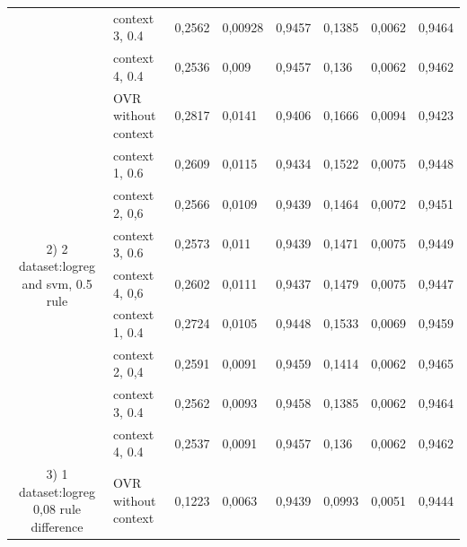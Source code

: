 \documentclass{siamart171218}
\begin{document}
\begin{appendices}
\begin{table}[H]
{\begin{tabular}{|c|l|lll|lll|}
 & context 3, 0.4 & \multicolumn{1}{l|}{0,2562} & \multicolumn{1}{l|}{0,00928} & 0,9457 & \multicolumn{1}{l|}{0,1385} & \multicolumn{1}{l|}{0,0062} & 0,9464 \\ \cline{2-8} 
 & context 4, 0.4 & \multicolumn{1}{l|}{0,2536} & \multicolumn{1}{l|}{0,009} & 0,9457 & \multicolumn{1}{l|}{0,136} & \multicolumn{1}{l|}{0,0062} & 0,9462 \\ \hline
\multirow{9}{*}{2) 2 dataset:logreg and svm, 0.5 rule} & OVR   without context & \multicolumn{1}{l|}{0,2817} & \multicolumn{1}{l|}{0,0141} & 0,9406 & \multicolumn{1}{l|}{0,1666} & \multicolumn{1}{l|}{0,0094} & 0,9423 \\ \cline{2-8} 
 & context 1, 0.6 & \multicolumn{1}{l|}{0,2609} & \multicolumn{1}{l|}{0,0115} & 0,9434 & \multicolumn{1}{l|}{0,1522} & \multicolumn{1}{l|}{0,0075} & 0,9448 \\ \cline{2-8} 
 & context 2, 0,6 & \multicolumn{1}{l|}{0,2566} & \multicolumn{1}{l|}{0,0109} & 0,9439 & \multicolumn{1}{l|}{0,1464} & \multicolumn{1}{l|}{0,0072} & 0,9451 \\ \cline{2-8} 
 & context 3, 0.6 & \multicolumn{1}{l|}{0,2573} & \multicolumn{1}{l|}{0,011} & 0,9439 & \multicolumn{1}{l|}{0,1471} & \multicolumn{1}{l|}{0,0075} & 0,9449 \\ \cline{2-8} 
 & context 4, 0,6 & \multicolumn{1}{l|}{0,2602} & \multicolumn{1}{l|}{0,0111} & 0,9437 & \multicolumn{1}{l|}{0,1479} & \multicolumn{1}{l|}{0,0075} & 0,9447 \\ \cline{2-8} 
 & context 1, 0.4 & \multicolumn{1}{l|}{0,2724} & \multicolumn{1}{l|}{0,0105} & 0,9448 & \multicolumn{1}{l|}{0,1533} & \multicolumn{1}{l|}{0,0069} & 0,9459 \\ \cline{2-8} 
 & context 2, 0,4 & \multicolumn{1}{l|}{0,2591} & \multicolumn{1}{l|}{0,0091} & 0,9459 & \multicolumn{1}{l|}{0,1414} & \multicolumn{1}{l|}{0,0062} & 0,9465 \\ \cline{2-8} 
 & context 3, 0.4 & \multicolumn{1}{l|}{0,2562} & \multicolumn{1}{l|}{0,0093} & 0,9458 & \multicolumn{1}{l|}{0,1385} & \multicolumn{1}{l|}{0,0062} & 0,9464 \\ \cline{2-8} 
 & context 4, 0.4 & \multicolumn{1}{l|}{0,2537} & \multicolumn{1}{l|}{0,0091} & 0,9457 & \multicolumn{1}{l|}{0,136} & \multicolumn{1}{l|}{0,0062} & 0,9462 \\ \hline
\multirow{9}{*}{3) 1 dataset:logreg 0,08 rule difference} & OVR   without context & \multicolumn{1}{l|}{0,1223} & \multicolumn{1}{l|}{0,0063} & 0,9439 & \multicolumn{1}{l|}{0,0993} & \multicolumn{1}{l|}{0,0051} & 0,9444 \\ \cline{2-8} 

\end{tabular}}
\end{table}
\end{appendices}
\end{document}
